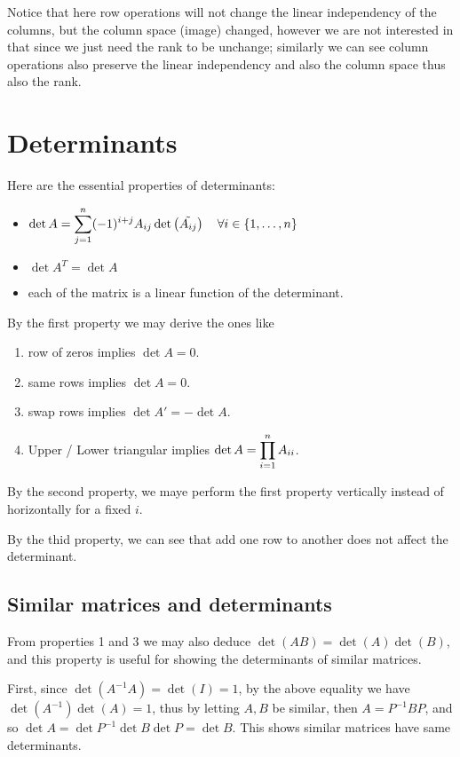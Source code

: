\documentclass[11pt, cyan, night, 1in]{LatexTemplate/hw}
\begin{document}
Notice that here row operations will not change the linear independency of the columns, but the column space (image)  changed, however we are not interested in that since we just need the rank to be unchange; similarly we can see column operations also preserve the linear independency and also the column space thus also the rank.

\section{Determinants}

Here are the essential properties of determinants:

\begin{itemize}
    \item $\det A = \displaystyle\sum_{j=1}^n (-1)^{i+j} A_{ij} \det\left(\tilde{A_{ij}}\right)\quad \forall i\in\{1,\dots,n\}$
    \item $\det A^T = \det A$
    \item each  of the matrix is a linear function of the determinant.
\end{itemize}

By the first property we may derive the ones like 
\begin{enumerate}
    \item row of zeros implies $\det A = 0$.
    \item same rows implies $\det A = 0$.
    \item swap rows implies $\det A' = -\det A$.
    \item Upper / Lower triangular implies $\det A=\displaystyle\prod_{i=1}^n A_{ii}$.
\end{enumerate}

By the second property, we maye perform the first property vertically instead of horizontally for a fixed $i$.

By the thid property, we can see that add one row to another does not affect the determinant.

\subsection{Similar matrices and determinants}

From properties 1 and 3 we may also deduce $\det(AB)=\det(A)\det(B)$, and this property is useful for showing the determinants of similar matrices. 

First, since $\det(A^{-1}A)=\det(I)=1$, by the above equality we have $\det(A^{-1})\det(A)=1$, thus by letting $A,B$ be similar, then $A=P^{-1}BP$, and so $\det A = \det P^{-1} \det B \det P = \det B$. This shows similar matrices have same determinants.
\end{document}
